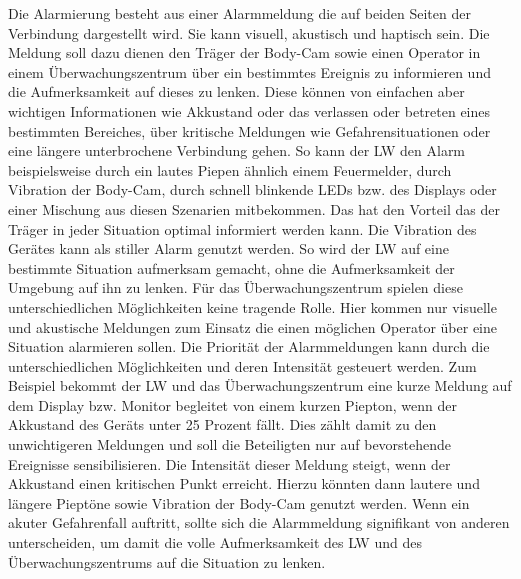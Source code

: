 \documentclass[thesis.tex]{subfiles}
\begin{document}
Die Alarmierung besteht aus einer Alarmmeldung die auf beiden Seiten der Verbindung dargestellt wird.
Sie kann visuell, akustisch und haptisch sein.
Die Meldung soll dazu dienen den Träger der Body-Cam sowie einen Operator in einem Überwachungszentrum über ein bestimmtes Ereignis zu informieren und die Aufmerksamkeit auf dieses zu lenken.
Diese können von einfachen aber wichtigen Informationen wie Akkustand oder das verlassen oder betreten eines bestimmten Bereiches, über kritische Meldungen wie Gefahrensituationen oder eine längere unterbrochene Verbindung gehen.
So kann der LW den Alarm beispielsweise durch ein lautes Piepen ähnlich einem Feuermelder, durch Vibration der Body-Cam, durch schnell blinkende LEDs bzw. des Displays oder einer Mischung aus diesen Szenarien mitbekommen.
Das hat den Vorteil das der Träger in jeder Situation optimal informiert werden kann.
Die Vibration des Gerätes kann als stiller Alarm genutzt werden.
So wird der LW auf eine bestimmte Situation aufmerksam gemacht, ohne die Aufmerksamkeit der Umgebung auf ihn zu lenken.
Für das Überwachungszentrum spielen diese unterschiedlichen Möglichkeiten keine tragende Rolle.
Hier kommen nur visuelle und akustische Meldungen zum Einsatz die einen möglichen Operator über eine Situation alarmieren sollen.
Die Priorität der Alarmmeldungen kann durch die unterschiedlichen Möglichkeiten und deren Intensität gesteuert werden.
Zum Beispiel bekommt der LW und das Überwachungszentrum eine kurze Meldung auf dem Display bzw. Monitor begleitet von einem kurzen Piepton, wenn der Akkustand des Geräts unter 25 Prozent fällt.
Dies zählt damit zu den unwichtigeren Meldungen und soll die Beteiligten nur auf bevorstehende Ereignisse sensibilisieren.
Die Intensität dieser Meldung steigt, wenn der Akkustand einen kritischen Punkt erreicht.
Hierzu könnten dann lautere und längere Pieptöne sowie Vibration der Body-Cam genutzt werden.
Wenn ein akuter Gefahrenfall auftritt, sollte sich die Alarmmeldung signifikant von anderen unterscheiden, um damit die volle Aufmerksamkeit des LW und des Überwachungszentrums auf die Situation zu lenken.
\\
\end{document}
